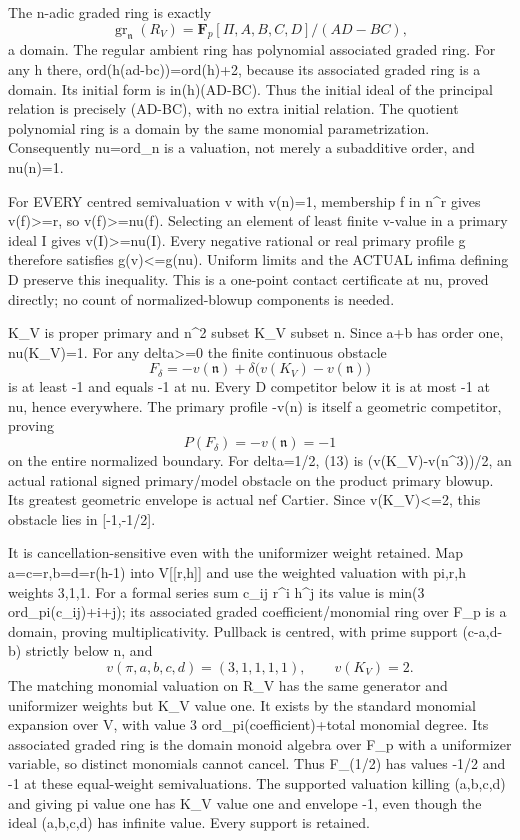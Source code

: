 \documentclass[11pt]{article}
\begin{document}
The n-adic graded ring is exactly
\[
 \operatorname{gr}_{\mathfrak n}(R_V)
   =\mathbf F_p[\Pi,A,B,C,D]/(AD-BC),                       \tag{12}
\]
a domain. The regular ambient ring has polynomial associated graded ring. For any h there, ord(h(ad-bc))=ord(h)+2, because its associated graded ring is a domain. Its initial form is in(h)(AD-BC). Thus the initial ideal of the principal relation is precisely (AD-BC), with no extra initial relation. The quotient polynomial ring is a domain by the same monomial parametrization. Consequently nu=ord\_n is a valuation, not merely a subadditive order, and nu(n)=1.

For EVERY centred semivaluation v with v(n)=1, membership f in n\textasciicircum{}r gives v(f)>=r, so v(f)>=nu(f). Selecting an element of least finite v-value in a primary ideal I gives v(I)>=nu(I). Every negative rational or real primary profile g therefore satisfies g(v)<=g(nu). Uniform limits and the ACTUAL infima defining D preserve this inequality. This is a one-point contact certificate at nu, proved directly; no count of normalized-blowup components is needed.

K\_V is proper primary and n\textasciicircum{}2 subset K\_V subset n. Since a+b has order one, nu(K\_V)=1. For any delta>=0 the finite continuous obstacle
\[
 F_\delta=-v(\mathfrak n)+\delta\big(v(K_V)-v(\mathfrak n)\big)           \tag{13}
\]
is at least -1 and equals -1 at nu. Every D competitor below it is at most -1 at nu, hence everywhere. The primary profile -v(n) is itself a geometric competitor, proving
\[
 P(F_\delta)=-v(\mathfrak n)=-1
\]
on the entire normalized boundary. For delta=1/2, (13) is (v(K\_V)-v(n\textasciicircum{}3))/2, an actual rational signed primary/model obstacle on the product primary blowup. Its greatest geometric envelope is actual nef Cartier. Since v(K\_V)<=2, this obstacle lies in [-1,-1/2].

It is cancellation-sensitive even with the uniformizer weight retained. Map a=c=r,b=d=r(h-1) into V[[r,h]] and use the weighted valuation with pi,r,h weights 3,1,1. For a formal series sum c\_ij r\textasciicircum{}i h\textasciicircum{}j its value is min(3 ord\_pi(c\_ij)+i+j); its associated graded coefficient/monomial ring over F\_p is a domain, proving multiplicativity. Pullback is centred, with prime support (c-a,d-b) strictly below n, and
\[
 v(\pi,a,b,c,d)=(3,1,1,1,1),\qquad v(K_V)=2.
\]
The matching monomial valuation on R\_V has the same generator and uniformizer weights but K\_V value one. It exists by the standard monomial expansion over V, with value 3 ord\_pi(coefficient)+total monomial degree. Its associated graded ring is the domain monoid algebra over F\_p with a uniformizer variable, so distinct monomials cannot cancel. Thus F\_(1/2) has values -1/2 and -1 at these equal-weight semivaluations. The supported valuation killing (a,b,c,d) and giving pi value one has K\_V value one and envelope -1, even though the ideal (a,b,c,d) has infinite value. Every support is retained.
\end{document}

